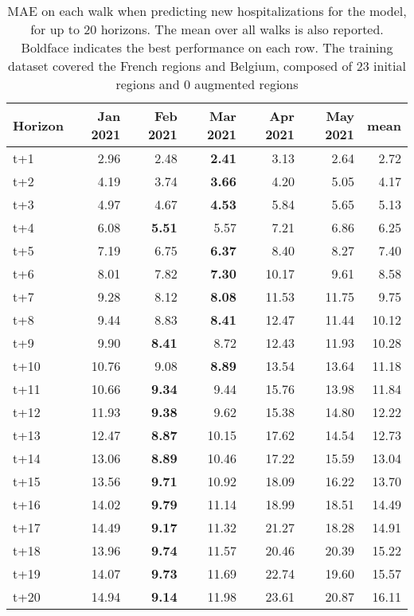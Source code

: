 \begin{table}[H]
\centering
\caption{MAE on each walk when predicting new hospitalizations for the model, for up to 20 horizons. The mean over all walks is also reported. Boldface indicates the best performance on each row. The training dataset covered the French regions and Belgium, composed of 23 initial regions and 0 augmented regions }
\label{tab:MAE_walk_dense_model}
\begin{tabular}{lrrrrrr}
\toprule
Horizon &  Jan 2021 &  Feb 2021 &  Mar 2021 &  Apr 2021 &  May 2021 &  mean \\
\midrule
t+1  & 2.96  & 2.48  & \textbf{2.41}  & 3.13  & 2.64  & 2.72  \\
t+2  & 4.19  & 3.74  & \textbf{3.66}  & 4.20  & 5.05  & 4.17  \\
t+3  & 4.97  & 4.67  & \textbf{4.53}  & 5.84  & 5.65  & 5.13  \\
t+4  & 6.08  & \textbf{5.51}  & 5.57  & 7.21  & 6.86  & 6.25  \\
t+5  & 7.19  & 6.75  & \textbf{6.37}  & 8.40  & 8.27  & 7.40  \\
t+6  & 8.01  & 7.82  & \textbf{7.30}  & 10.17  & 9.61  & 8.58  \\
t+7  & 9.28  & 8.12  & \textbf{8.08}  & 11.53  & 11.75  & 9.75  \\
t+8  & 9.44  & 8.83  & \textbf{8.41}  & 12.47  & 11.44  & 10.12  \\
t+9  & 9.90  & \textbf{8.41}  & 8.72  & 12.43  & 11.93  & 10.28  \\
t+10  & 10.76  & 9.08  & \textbf{8.89}  & 13.54  & 13.64  & 11.18  \\
t+11  & 10.66  & \textbf{9.34}  & 9.44  & 15.76  & 13.98  & 11.84  \\
t+12  & 11.93  & \textbf{9.38}  & 9.62  & 15.38  & 14.80  & 12.22  \\
t+13  & 12.47  & \textbf{8.87}  & 10.15  & 17.62  & 14.54  & 12.73  \\
t+14  & 13.06  & \textbf{8.89}  & 10.46  & 17.22  & 15.59  & 13.04  \\
t+15  & 13.56  & \textbf{9.71}  & 10.92  & 18.09  & 16.22  & 13.70  \\
t+16  & 14.02  & \textbf{9.79}  & 11.14  & 18.99  & 18.51  & 14.49  \\
t+17  & 14.49  & \textbf{9.17}  & 11.32  & 21.27  & 18.28  & 14.91  \\
t+18  & 13.96  & \textbf{9.74}  & 11.57  & 20.46  & 20.39  & 15.22  \\
t+19  & 14.07  & \textbf{9.73}  & 11.69  & 22.74  & 19.60  & 15.57  \\
t+20  & 14.94  & \textbf{9.14}  & 11.98  & 23.61  & 20.87  & 16.11  \\

\bottomrule
\end{tabular}
\end{table}
